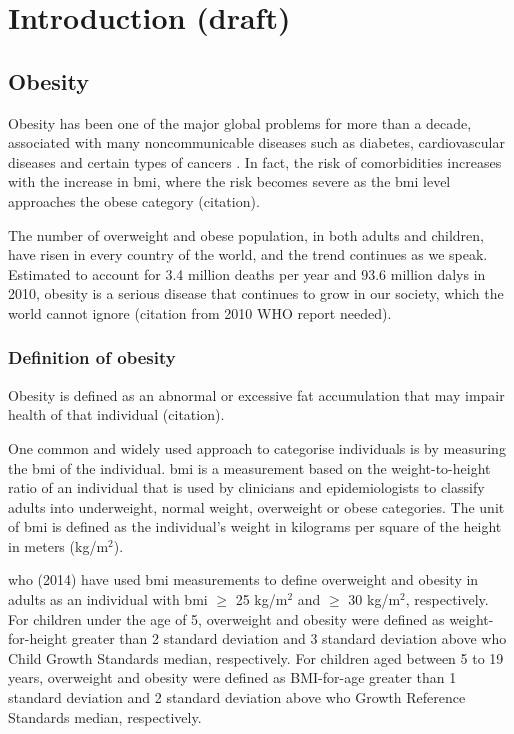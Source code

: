 \chapter{Introduction (draft)}
\label{ch:intro}


\section{Obesity}
\label{sec:obesity}

Obesity has been one of the major global problems for more than a decade, associated with many noncommunicable diseases such as diabetes, cardiovascular diseases and certain types of cancers \citep{WHO2014}.
In fact, the risk of comorbidities increases with the increase in \gls{bmi}, where the risk becomes severe as the \gls{bmi} level approaches the obese category (citation).

The number of overweight and obese population, in both adults and children, have risen in every country of the world, and the trend continues as we speak.
Estimated to account for 3.4 million deaths per year and 93.6 million \glspl{daly} in 2010, obesity is a serious disease that continues to grow in our society, which the world cannot ignore (citation from 2010 WHO report needed).

\subsection{Definition of obesity}
\label{sub:definition_of_obesity}

Obesity is defined as an abnormal or excessive fat accumulation that may impair health of that individual (citation).

One common and widely used approach to categorise individuals is by measuring the \gls{bmi} of the individual.
\gls{bmi} is a measurement based on the weight-to-height ratio of an individual that is used by clinicians and epidemiologists to classify adults into underweight, normal weight, overweight or obese categories.
The unit of \gls{bmi} is defined as the individual's weight in kilograms per square of the height in meters (kg/m$^2$).

\gls{who} (2014) have used \gls{bmi} measurements to define overweight and obesity in adults as an individual with \gls{bmi} $\geq$ 25 kg/m$^2$ and $\geq$ 30 kg/m$^2$, respectively.
For children under the age of 5, overweight and obesity were defined as weight-for-height greater than 2 standard deviation and 3 standard deviation above \gls{who} Child Growth Standards median, respectively.
For children aged between 5 to 19 years, overweight and obesity were defined as BMI-for-age greater than 1 standard deviation and 2 standard deviation above \gls{who} Growth Reference Standards median, respectively.

